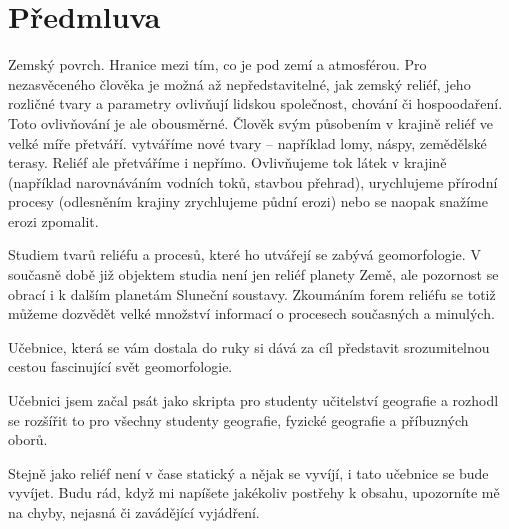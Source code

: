 \chapter*{Předmluva}
Zemský povrch. Hranice mezi tím, co je pod zemí a atmosférou. Pro nezasvěceného člověka je možná až nepředstavitelné, jak zemský reliéf, jeho rozličné tvary a parametry ovlivňují lidskou společnost, chování či hospoodaření. Toto ovlivňování je ale obousměrné. Člověk svým působením v krajině reliéf ve velké míře přetváří. vytváříme nové tvary -- například lomy, náspy, zemědělské terasy. Reliéf ale přetváříme i nepřímo. Ovlivňujeme tok látek v krajině (například narovnáváním vodních toků, stavbou přehrad), urychlujeme přírodní procesy (odlesněním krajiny zrychlujeme půdní erozi) nebo se naopak snažíme erozi zpomalit. 

Studiem tvarů reliéfu a procesů, které ho utvářejí se zabývá geomorfologie. V současně době již objektem studia není jen reliéf planety Země, ale pozornost se obrací i k dalším planetám Sluneční soustavy. Zkoumáním forem reliéfu se totiž můžeme dozvědět velké množství informací o procesech současných a minulých.  

Učebnice, která se vám dostala do ruky si dává za cíl představit srozumitelnou cestou fascinující svět geomorfologie. 

Učebnici jsem začal psát jako skripta pro studenty učitelství geografie a rozhodl se rozšířit to pro všechny studenty geografie, fyzické geografie a příbuzných oborů. 

Stejně jako reliéf není v čase statický a nějak se vyvíjí, i tato učebnice se bude vyvíjet. Budu rád, když mi napíšete jakékoliv postřehy k obsahu, upozorníte mě na chyby, nejasná či zavádějící vyjádření.

 
%
%
